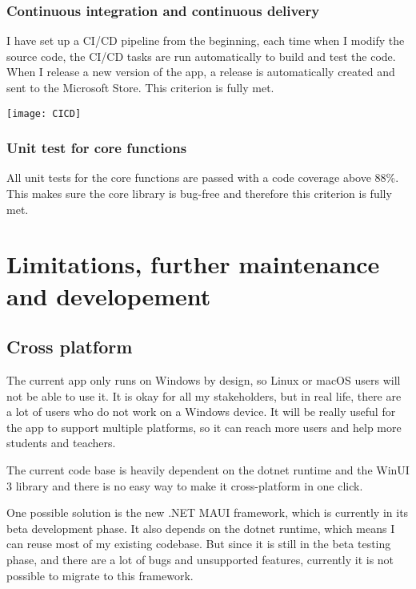 \documentclass[report.tex]{subfiles}
\begin{document}
\subsubsection{Continuous integration and continuous delivery}

I have set up a CI/CD pipeline from the beginning, each time when I modify the source code, the CI/CD tasks are run automatically to build and test the code. When I release a new version of the app, a release is automatically created and sent to the Microsoft Store. This criterion is fully met.

\texttt{[image: CICD]}

\subsubsection{Unit test for core functions}

All unit tests for the core functions are passed with a code coverage above 88\%. This makes sure the core library is bug-free and therefore this criterion is fully met.

\section{Limitations, further maintenance and developement}

\subsection{Cross platform}

The current app only runs on Windows by design, so Linux or macOS users will not be able to use it. It is okay for all my stakeholders, but in real life, there are a lot of users who do not work on a Windows device. It will be really useful for the app to support multiple platforms, so it can reach more users and help more students and teachers.

The current code base is heavily dependent on the dotnet runtime and the WinUI 3 library and there is no easy way to make it cross-platform in one click.

One possible solution is the new .NET MAUI framework\cite{microsoft:docs:what-is-maui}, which is currently in its beta development phase. It also depends on the dotnet runtime, which means I can reuse most of my existing codebase. But since it is still in the beta testing phase, and there are a lot of bugs and unsupported features, currently it is not possible to migrate to this framework.
\end{document}
